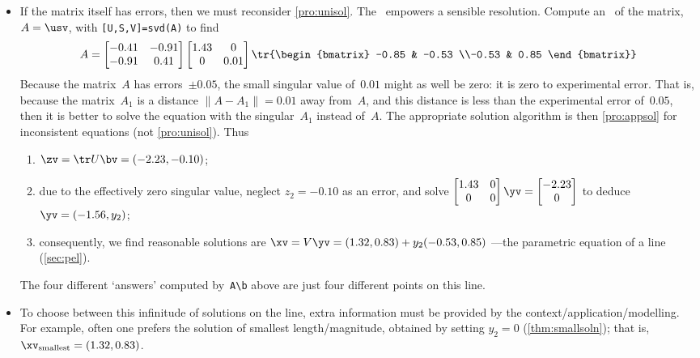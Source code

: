 \begin{example}
\begin{solution}
\begin{itemize}
\item If the matrix itself has errors, then we must reconsider \autoref{pro:unisol}.
The \svd\ empowers a sensible resolution.
Compute an \svd\ of the matrix, \(A=\usv\), with \verb|[U,S,V]=svd(A)| to find \twodp
\setbox\ajrqrbox\hbox{}%
\marginpar{\usebox{\ajrqrbox\\[2ex]}}%
\begin{equation*}
A=\begin{bmatrix} -0.41 & -0.91
\\-0.91 &  0.41 \end{bmatrix}
\begin{bmatrix} 1.43 & 0
\\0 &  0.01 \end{bmatrix}
\tr{\begin{bmatrix} -0.85 & -0.53
\\-0.53 &  0.85 \end{bmatrix}}
\end{equation*}
Because the matrix~\(A\) has errors~\(\pm0.05\), the small singular value of~\(0.01\) might as well be zero: it is zero to experimental error.
That is, because the matrix~\(A_1\) is a distance \(\|A-A_1\|=0.01\) away from~\(A\), and this distance is less than the experimental error of~\(0.05\), then it is better to solve the equation with the singular~\(A_1\) instead of~\(A\).
The appropriate solution algorithm is then \autoref{pro:appsol} for inconsistent equations (not \autoref{pro:unisol}).
Thus \twodp
\begin{enumerate}
\item \(\zv=\tr U\bv=(-2.23,-0.10)\);
\item due to the effectively zero singular value, neglect \(z_2=-0.10\) as an error, and solve
\(\begin{bmatrix} 1.43 & 0
\\0 &  0 \end{bmatrix}\yv=\begin{bmatrix} -2.23\\0 \end{bmatrix}\)
to deduce \(\yv=(-1.56,y_2)\);
\item consequently, we find reasonable solutions are \(\xv=V\yv=(1.32,0.83)+y_2(-0.53,0.85)\) ---the parametric equation of a line (\autoref{sec:pel}).
\end{enumerate}
The four different `answers' computed by~\verb|A\b| above are just four different points on this line.

\item To choose between this infinitude of solutions on the line, extra information must be provided by the context\slash application\slash modelling.  
For example, often one prefers the solution of smallest length\slash magnitude, obtained by setting \(y_2=0\) (\autoref{thm:smallsoln}); that is, \(\xv_{\text{smallest}}=(1.32,0.83)\).
\end{itemize}
\end{solution}
\end{example}




